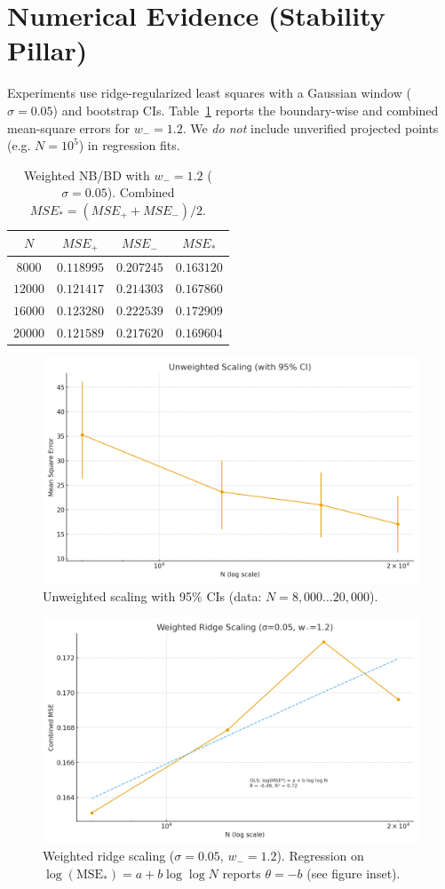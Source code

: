 \documentclass[11pt]{article}
\theoremstyle{remark}
\begin{document}
\section{Numerical Evidence (Stability Pillar)}
Experiments use ridge-regularized least squares with a Gaussian window ($\sigma=0.05$) and bootstrap CIs.
Table~\ref{tab:w12} reports the boundary-wise and combined mean-square errors for $w_-=1.2$.
We \emph{do not} include unverified projected points (e.g. $N=10^5$) in regression fits.

\begin{table}[h]
\centering
\begin{tabular}{c|c|c|c}
\hline
$N$ & $MSE_+$ & $MSE_-$ & $MSE_\ast$ \\
\hline
$8000$  & $0.118995$ & $0.207245$ & $0.163120$ \\
$12000$ & $0.121417$ & $0.214303$ & $0.167860$ \\
$16000$ & $0.123280$ & $0.222539$ & $0.172909$ \\
$20000$ & $0.121589$ & $0.217620$ & $0.169604$ \\
\hline
\end{tabular}
\caption{Weighted NB/BD with $w_-=1.2$ ($\sigma=0.05$). Combined $MSE_\ast=(MSE_++MSE_-)/2$.}
\label{tab:w12}
\end{table}

\begin{figure}[h]
\centering
\includegraphics[width=0.75\linewidth]{figures/unweighted_scaling.png}
\caption{Unweighted scaling with 95\% CIs (data: $N=8{,}000\ldots 20{,}000$).}
\label{fig:unweighted}
\end{figure}

\begin{figure}[h]
\centering
\includegraphics[width=0.75\linewidth]{figures/weighted_scaling.png}
\caption{Weighted ridge scaling ($\sigma=0.05$, $w_-=1.2$). Regression on $\log(\mathrm{MSE}_\ast)=a+b\log\log N$ reports $\theta=-b$ (see figure inset).}
\label{fig:weighted}
\end{figure}
\end{document}
